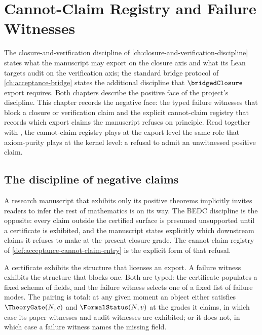 \chapter{Cannot-Claim Registry and Failure Witnesses}
\label{ch:acceptance-cannot-claim}

The closure-and-verification discipline of \autoref{ch:closure-and-verification-discipline} states what the manuscript may export on the closure axis and what its Lean targets audit on the verification axis; the standard bridge protocol of \autoref{ch:acceptance-bridge} states the additional discipline that $\bridgedClosure$ export requires. Both chapters describe the positive face of the project's discipline. This chapter records the negative face: the typed failure witnesses that block a closure or verification claim and the explicit cannot-claim registry that records which export claims the manuscript refuses on principle. Read together with , the cannot-claim registry plays at the export level the same role that axiom-purity plays at the kernel level: a refusal to admit an unwitnessed positive claim.

\section{The discipline of negative claims}
\label{sec:acceptance-cannot-claim-discipline}

\begin{remark}
\label{rem:acceptance-negative-claims-surface}
A research manuscript that exhibits only its positive theorems implicitly invites readers to infer the rest of mathematics is on its way. The BEDC discipline is the opposite: every claim outside the certified surface is presumed unsupported until a certificate is exhibited, and the manuscript states explicitly which downstream claims it refuses to make at the present closure grade. The cannot-claim registry of \autoref{def:acceptance-cannot-claim-entry} is the explicit form of that refusal.
\end{remark}

\begin{remark}
\label{rem:acceptance-failure-witness-dual}
A certificate exhibits the structure that licenses an export. A failure witness exhibits the structure that blocks one. Both are typed: the certificate populates a fixed schema of fields, and the failure witness selects one of a fixed list of failure modes. The pairing is total: at any given moment an object either satisfies $\TheoryGate(N, c)$ and $\FormalStatus(N, v)$ at the grades it claims, in which case its paper witnesses and audit witnesses are exhibited; or it does not, in which case a failure witness names the missing field.
\end{remark}

